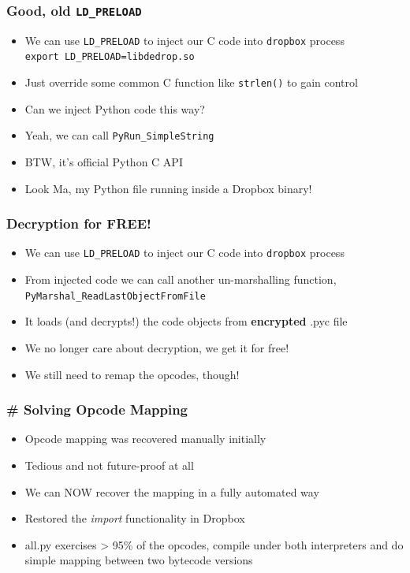 \documentclass{beamer}
\begin{document}
\begin{frame}
\frametitle{Good, old \texttt{LD\_PRELOAD}}
\begin{itemize}
\itemsep 1em
\item{We can use \texttt{LD\_PRELOAD} to inject our C code into \texttt{dropbox} process} \\
	\vspace{1em} {\texttt{export LD\_PRELOAD=libdedrop.so}}
\item{Just override some common C function like \texttt{strlen()} to gain control}
\item{Can we inject Python code this way?}
\item{Yeah, we can call \texttt{PyRun\_SimpleString}}
\item{BTW, it's official Python C API}
\item{Look Ma, my Python file running inside a Dropbox binary!}
\end{itemize}
\end{frame}

\begin{frame}
\frametitle{Decryption for FREE!}
\begin{itemize}
\itemsep 2em
\item{We can use \texttt{LD\_PRELOAD} to inject our C code into \texttt{dropbox} process}
\item{From injected code we can call another un-marshalling function, \texttt{PyMarshal\_ReadLastObjectFromFile}}
\item{It loads (and decrypts!) the code objects from \textbf{encrypted} .pyc file}
\item{We no longer care about decryption, we get it for free!}
\item{We still need to remap the opcodes, though!}
\end{itemize}
\end{frame}

\begin{frame}
\frametitle{\# Solving Opcode Mapping}
\begin{itemize}
\itemsep 2em
\item{Opcode mapping was recovered manually initially}
\item{Tedious and not future-proof at all}
\item{We can NOW recover the mapping in a fully automated way}
\item{Restored the \emph{import} functionality in Dropbox}
\item{all.py exercises > 95\% of the opcodes, compile under both interpreters
and do simple mapping between two bytecode versions}
\end{itemize}
\end{frame}
\end{document}
